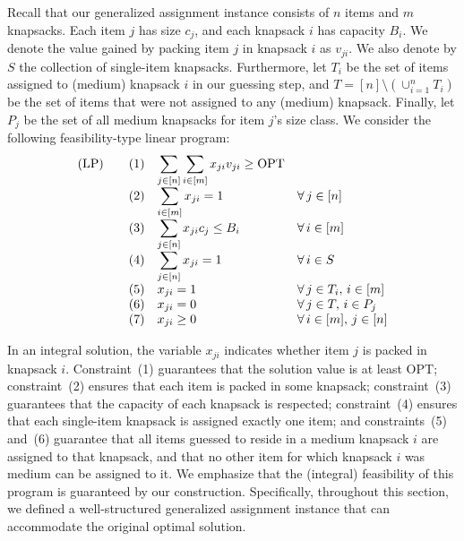 \documentclass[11pt]{article}
\theoremstyle{plain}
\theoremstyle{definition}
\newcommand{\opt}{\mathrm{OPT}}
\begin{document}
\smallskip {} Recall that our generalized assignment instance consists of $n$ items and $m$ knapsacks. Each item $j$ has size $c_j$, and each knapsack $i$ has capacity $B_i$. We denote the value gained by packing item $j$ in knapsack $i$ as $v_{ji}$. We also denote by $S$ the collection of single-item knapsacks. Furthermore, let $T_i$ be the set of items assigned to (medium) knapsack $i$ in our guessing step, and $T = [n] \setminus (\cup_{i=1}^n T_i)$ be the set of items that were not assigned to any (medium) knapsack. Finally, let $P_j$ be the set of all medium knapsacks for item $j$'s size class. We consider the following feasibility-type linear program:
$$
\begin{array}{lll}
(\rm LP) \quad & (1) \quad {\displaystyle \sum_{j \in [n]}\sum_{i \in [m]} x_{ji}v_{ji} \geq \opt} &  \\
 & (2) \quad {\displaystyle \sum_{i \in [m]} x_{ji} = 1} & \forall \, j \in [n] \\
 & (3) \quad {\displaystyle \sum_{j \in [n]} x_{ji} c_{j} \leq B_i} & \forall \, i \in [m] \\
 & (4) \quad {\displaystyle \sum_{j \in [n]} x_{ji} = 1} & \forall \, i \in S \\
 & (5) \quad x_{ji} = 1 & \forall \, j \in T_i, \, i \in [m] \\
 & (6) \quad x_{ji} = 0 & \forall \, j \in T, \, i \in P_j \\
 & (7) \quad x_{ji} \geq 0 & \forall \, i \in [m], \, j \in [n] \end{array}
$$

In an integral solution, the variable $x_{ji}$ indicates whether item $j$ is packed in knapsack $i$. Constraint~(1) guarantees that the solution value is at least $\opt$; constraint~(2) ensures that each item is packed in some knapsack; constraint~(3) guarantees that the capacity of each knapsack is respected; constraint~(4) ensures that each single-item knapsack is assigned exactly one item; and constraints~(5) and~(6) guarantee that all items guessed to reside in a medium knapsack $i$ are assigned to that knapsack, and that no other item for which knapsack $i$ was medium can be assigned to it. We emphasize that the (integral) feasibility of this program is guaranteed by our construction. Specifically, throughout this section, we defined a well-structured generalized assignment instance that can accommodate the original optimal solution.
\end{document}
